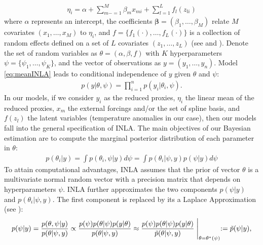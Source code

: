 \documentclass[12pt]{amsart}
\theoremstyle{plain}
\theoremstyle{definition}
\theoremstyle{remark}
\newcommand{\bl}[1]{\color{ForestGreen}\textbf{[Bo: #1]}\normalcolor}
\begin{document}


\begin{align}\label{eq:meanINLA}
  \eta_i = \alpha +\sum_{m-=1}^M\beta_mx_{mi}+\sum_{l=1}^Lf_l(z_{li})
\end{align}
where $\alpha$ represents an intercept, the coefficients
$\mathbf{\beta} = (\beta_1,\ldots,\beta_M)$ relate $M$ covariates
$(x_1,\ldots,x_M)$ to $\eta_i$, and $f = \{f_1(\cdot),\ldots,f_L(\cdot)\}$ is a collection of
random effects defined on a set of $L$ covariates $(z_1,\ldots,z_L)$ (see
\cite{Rue2009} and \cite{Blangiardo2013}). 
Denote the set of random variables as
$\theta = (\alpha,\beta,f)$ with $K$ hyperparameters $\psi =
\{\psi_1,\ldots,\psi_K\}$, and the vector of observations as $y=(y_1,\ldots,y_n)$. Model \eqref{eq:meanINLA} leads to conditional independence of $y$ given $\theta$ and $\psi$:
\begin{align*}
  p(y|\theta,\psi)=\prod_{i=1}^np(y_i|\theta_i,\psi).
\end{align*}
In our models, if we consider $y_i$ as the reduced proxies,  $\eta_i$ the
linear mean of the reduced proxies, $x_m$ the external forcings and/or the set
of spline basis, and $f(z_l)$ the latent variables (temperature anomalies in
our case), then our models fall into the general specification of INLA. %
The main objectives of our Bayesian estimation are to compute the
marginal posterior distribution of each parameter in $\theta$:
\begin{align*}
  p(\theta_i|y) = \int p(\theta_i,\psi|y)d \psi = \int p(\theta_i|\psi,y)p(\psi|y)d \psi
\end{align*}
To attain computational advantages, INLA assumes that the prior of
vector $\theta$ is a multivariate normal random vector with a precision matrix
that depends on hyperparameters $\psi$. INLA further 
approximates the two components $p(\psi|y)$ and $p(\theta_i|\psi,y)$. The first component is replaced by its a
Laplace Approximation (see \cite{Tierney1986}):
\begin{align*}
  p(\psi|y)=\frac{p(\theta,\psi|y)}{p(\theta|\psi,y)}\propto \frac{p(\psi)p(\theta|\psi)p(y|\theta)}{p(\theta|\psi,y)}
            \approx  \frac{p(\psi)p(\theta|\psi)p(y|\theta)}{\tilde p(\theta|\psi,y)} \Biggm |_{\theta=\theta^*(\psi)} := \tilde p(\psi|y),
\end{align*}
\end{document}
